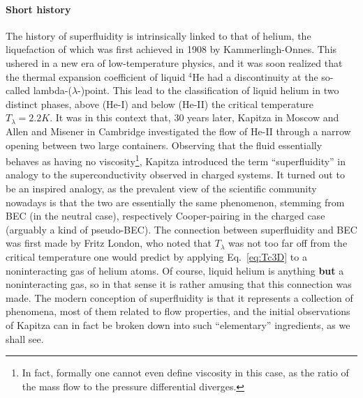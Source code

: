 \paragraph{Short history}
The history of superfluidity is intrinsically linked to that of helium,
the liquefaction of which was first achieved in 1908 by
Kammerlingh-Onnes. This ushered in a new era of low-temperature
physics, and it was soon realized that the thermal expansion
coefficient of liquid ${}^4$He had a discontinuity at the so-called
lambda-($\lambda$-)point. This lead to the classification of liquid
helium in two distinct phases, above (He-I) and below (He-II) the
critical temperature $T_{\lambda} = 2.2K$. It was in this context
that, 30 years later, Kapitza in Moscow and Allen and Misener in
Cambridge investigated the flow of He-II through a narrow opening
between two large containers. Observing that the fluid essentially
behaves as having no viscosity\footnote{In fact, formally one cannot
  even define viscosity in this case, as the ratio of the mass flow to
  the pressure differential diverges.}, Kapitza introduced the term
``superfluidity'' in analogy to the superconductivity observed in
charged systems. It turned out to be an inspired analogy, as the
prevalent view of the scientific community nowadays is that the two
are essentially the same phenomenon, stemming from BEC (in the neutral
case), respectively Cooper-pairing in the charged case (arguably a
kind of pseudo-BEC). The connection between superfluidity and BEC was
first made by Fritz London, who noted that $T_{\lambda}$ was not too
far off from the critical temperature one would predict by applying
Eq.~\eqref{eq:Tc3D} to a noninteracting gas of helium atoms. Of
course, liquid helium is anything \textbf{but} a noninteracting gas, so in that
sense it is rather amusing that this connection was made. The modern
conception of superfluidity is that it represents a collection of
phenomena, most of them related to flow properties, and the initial
observations of Kapitza can in fact be broken down into such
``elementary'' ingredients, as we shall see.

